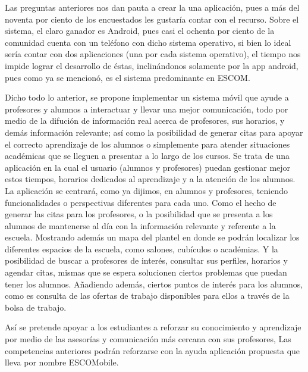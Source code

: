 \noindent
\newline
Las preguntas anteriores nos dan pauta a crear la una aplicación, pues a más del noventa por ciento de los
encuestados les gustaría contar con el recurso. Sobre el sistema, el claro ganador es Android, pues casi
el ochenta por ciento de la comunidad cuenta con un teléfono con dicho sistema operativo, si bien lo ideal
sería contar con dos aplicaciones (una por cada sistema operativo), el tiempo nos impide lograr el
desarrollo de éstas, inclinándonos solamente por la app android, pues como ya se mencionó, es el sistema
predominante en ESCOM.

\noindent
\newline
Dicho todo lo anterior, se propone implementar un sistema móvil que ayude a profesores y alumnos a interactuar 
y llevar una mejor comunicación, todo por medio de la difución de información real acerca de profesores, 
sus horarios, y demás información relevante; así como la posibilidad de generar citas para apoyar el correcto 
aprendizaje de los alumnos o simplemente para atender situaciones académicas que se lleguen a presentar a lo 
largo de los cursos.
Se trata de una aplicación en la cual el usuario (alumnos y profesores) puedan gestionar mejor estos 
tiempos, horarios dedicados al aprendizaje y a la atención de los alumnos. La aplicación se centrará, como 
ya dijimos, en alumnos y profesores, teniendo funcionalidades o perspectivas diferentes para cada uno. Como 
el hecho de generar las citas para los profesores, o la posibilidad que se presenta a los alumnos de 
mantenerse al día con la información relevante y referente a la escuela. Mostrando además un mapa del plantel 
en donde se podrán localizar los diferentes espacios de la escuela, como salones, cubículos o académias. 
Y la posibilidad de buscar a profesores de interés, consultar sus perfiles, horarios y agendar citas, 
mismas que se espera solucionen ciertos problemas que puedan tener los alumnos. Añadiendo además, ciertos
puntos de interés para los alumnos, como es consulta de las ofertas de trabajo disponibles para ellos a
través de la bolsa de trabajo. 

\noindent
Así se pretende apoyar a los estudiantes a reforzar su conocimiento y aprendizaje por medio de 
las asesorías y comunicación más cercana con sus profesores, Las competencias anteriores podrán reforzarse
con la ayuda aplicación propuesta que lleva por nombre ESCOMobile.
